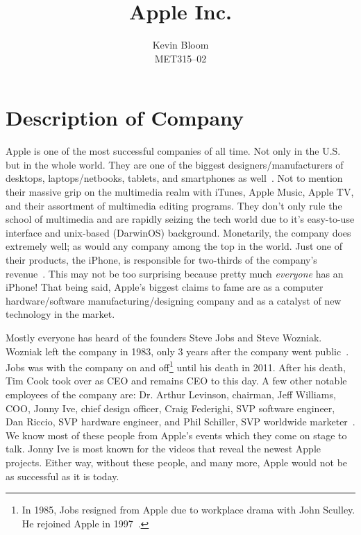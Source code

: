 \documentclass[12pt,a4paper,titlepage]{article}
\begin{document}
\title{Apple Inc.}
\author{Kevin Bloom \\ MET315--02}
\maketitle

\newpage

\tableofcontents

\newpage


\section{Description of Company}
Apple is one of the most successful companies of all time. Not only in the
U.S. but in the whole world. They are one of the biggest designers/manufacturers
of desktops, laptops/netbooks, tablets, and smartphones as
well~\cite{hoover}. Not to mention their massive grip on the multimedia realm
with iTunes, Apple Music, Apple TV, and their assortment of multimedia editing
programs. They don't only rule the school of multimedia and are rapidly seizing
the tech world due to it's easy-to-use interface and unix-based (DarwinOS)
background. Monetarily, the company does extremely well; as would any company
among the top in the world. Just one of their products, the iPhone, is
responsible for two-thirds of the company's revenue~\cite{hoover}. This may not
be too surprising because pretty much \emph{everyone} has an iPhone! That being
said, Apple's biggest claims to fame are as a computer hardware/software
manufacturing/designing company and as a catalyst of new technology in the
market.

Mostly everyone has heard of the founders Steve Jobs and Steve Wozniak. Wozniak
left the company in 1983, only 3 years after the company went
public~\cite{hoover}. Jobs was with the company on and off\footnote{In 1985,
  Jobs resigned from Apple due to workplace drama with John Sculley. He rejoined
  Apple in 1997~\cite{jobs}.} until his death in 2011. After his death, Tim Cook
took over as CEO and remains CEO to this day. A few other notable employees of
the company are: Dr. Arthur Levinson, chairman, Jeff Williams, COO, Jonny Ive,
chief design officer, Craig Federighi, SVP software engineer, Dan Riccio, SVP
hardware engineer, and Phil Schiller, SVP worldwide marketer~\cite{hoover}. We
know most of these people from Apple's events which they come on stage to
talk. Jonny Ive is most known for the videos that reveal the newest Apple
projects. Either way, without these people, and many more, Apple would not be as
successful as it is today.
\end{document}
